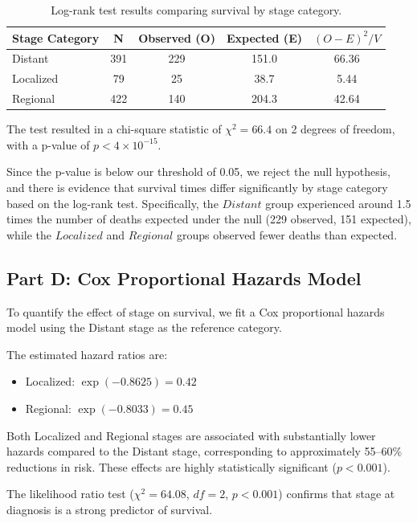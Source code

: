 \documentclass[12pt]{article}
\begin{document}
\begin{table}[htbp]
\centering
\begin{tabular}{lcccc}
\toprule
\textbf{Stage Category} & \textbf{N} & \textbf{Observed (O)} & \textbf{Expected (E)} & \textbf{$(O-E)^2/V$} \\ \midrule
Distant   & 391 & 229 & 151.0 & 66.36 \\
Localized & 79  & 25  & 38.7  & 5.44  \\
Regional  & 422 & 140 & 204.3 & 42.64 \\
\bottomrule
\end{tabular}
\caption{Log-rank test results comparing survival by stage category.}
\end{table}

The test resulted in a chi-square statistic of $\chi^2 = 66.4$ on 2 degrees of freedom, with a p-value of $p < 4 \times 10^{-15}$. 

Since the p-value is below our threshold of 0.05, we reject the null hypothesis, and there is evidence that survival times differ significantly by stage category based on the log-rank test. Specifically, the $Distant$ group experienced around 1.5 times the number of deaths expected under the null (229 observed, 151 expected), while the $Localized$ and $Regional$ groups observed fewer deaths than expected.

\subsection*{Part D: Cox Proportional Hazards Model}

To quantify the effect of stage on survival, we fit a Cox proportional hazards model using the Distant stage as the reference category.

The estimated hazard ratios are:
\begin{itemize}
    \item Localized: $\exp(-0.8625) = 0.42$
    \item Regional: $\exp(-0.8033) = 0.45$
\end{itemize}

Both Localized and Regional stages are associated with substantially lower hazards compared to the Distant stage, corresponding to approximately 55--60\% reductions in risk. These effects are highly statistically significant ($p < 0.001$).

The likelihood ratio test ($\chi^2 = 64.08$, $df = 2$, $p < 0.001$) confirms that stage at diagnosis is a strong predictor of survival.
\end{document}
